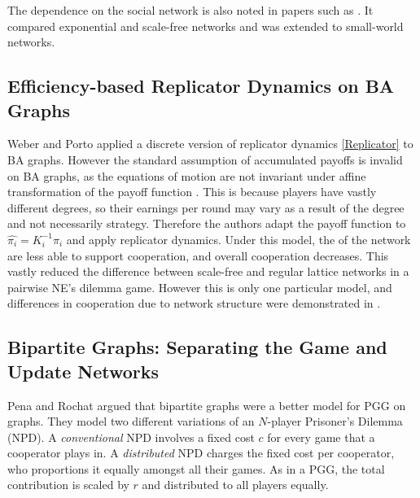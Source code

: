  \FloatBarrier
 \FloatBarrier
 
 
 The dependence on the social network is also noted in papers such as \cite{RN65}. It compared exponential and scale-free networks and was extended to small-world networks. \\
 
 \subsection{Efficiency-based Replicator Dynamics on BA Graphs}
 Weber and Porto \cite{RN77} applied a discrete version of replicator dynamics \eqref{Replicator} to BA graphs. However the standard assumption of accumulated payoffs is invalid on BA graphs, as the equations of motion are not invariant under affine transformation of the payoff function \cite{RN77}. This is because players have vastly different degrees, so their earnings per round may vary as a result of the degree and not necessarily strategy. Therefore the authors adapt the payoff function to $\hat{\pi_i} = K_i^{-1} \pi_i $ and apply replicator dynamics. Under this model, the  of the network are less able to support cooperation, and overall cooperation decreases. This vastly reduced the difference between scale-free and regular lattice networks in a pairwise NE's dilemma game. However this is only one particular model, and differences in cooperation due to network structure were demonstrated in \cite{RN62, RN44, RN43, RN28}.  \\
 
 
 \subsection{Bipartite Graphs: Separating the Game and Update Networks }
 Pena and Rochat \cite{RN48} argued that bipartite graphs were a better model for PGG on graphs. They model two different variations of an $N$-player Prisoner's Dilemma (NPD). A \emph{conventional} NPD involves a fixed cost $c$ for every game that a cooperator plays in. A \emph{distributed} NPD charges the fixed cost per cooperator, who proportions it equally amongst all their games. As in a PGG, the total contribution is scaled by $r$ and distributed to all players equally. \\
 
